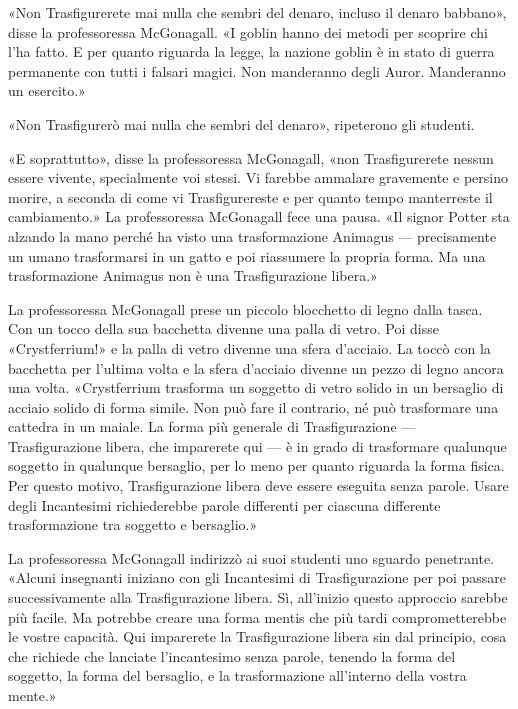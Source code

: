«Non Trasfigurerete mai nulla che sembri del denaro, incluso il denaro babbano», disse la professoressa McGonagall. «I goblin hanno dei metodi per scoprire chi l’ha fatto. E per quanto riguarda la legge, la nazione goblin è in stato di guerra permanente con tutti i falsari magici. Non manderanno degli Auror. Manderanno un esercito.»

«Non Trasfigurerò mai nulla che sembri del denaro», ripeterono gli studenti.

«E soprattutto», disse la professoressa McGonagall, «non Trasfigurerete nessun essere vivente, specialmente voi stessi. Vi farebbe ammalare gravemente e persino morire, a seconda di come vi Trasfigurereste e per quanto tempo manterreste il cambiamento.» La professoressa McGonagall fece una pausa. «Il signor Potter sta alzando la mano perché ha visto una trasformazione Animagus — precisamente un umano trasformarsi in un gatto e poi riassumere la propria forma. Ma una trasformazione Animagus non è una Trasfigurazione libera.»

La professoressa McGonagall prese un piccolo blocchetto di legno dalla tasca. Con un tocco della sua bacchetta divenne una palla di vetro. Poi disse «Crystferrium!» e la palla di vetro divenne una sfera d’acciaio. La toccò con la bacchetta per l’ultima volta e la sfera d’acciaio divenne un pezzo di legno ancora una volta. «Crystferrium trasforma un soggetto di vetro solido in un bersaglio di acciaio solido di forma simile. Non può fare il contrario, né può trasformare una cattedra in un maiale. La forma più generale di Trasfigurazione — Trasfigurazione libera, che imparerete qui — è in grado di trasformare qualunque soggetto in qualunque bersaglio, per lo meno per quanto riguarda la forma fisica. Per questo motivo, Trasfigurazione libera deve essere eseguita senza parole. Usare degli Incantesimi richiederebbe parole differenti per ciascuna differente trasformazione tra soggetto e bersaglio.»

La professoressa McGonagall indirizzò ai suoi studenti uno sguardo penetrante. «Alcuni insegnanti iniziano con gli Incantesimi di Trasfigurazione per poi passare successivamente alla Trasfigurazione libera. Sì, all’inizio questo approccio sarebbe più facile. Ma potrebbe creare una forma mentis che più tardi comprometterebbe le vostre capacità. Qui imparerete la Trasfigurazione libera sin dal principio, cosa che richiede che lanciate l’incantesimo senza parole, tenendo la forma del soggetto, la forma del bersaglio, e la trasformazione all’interno della vostra mente.»

